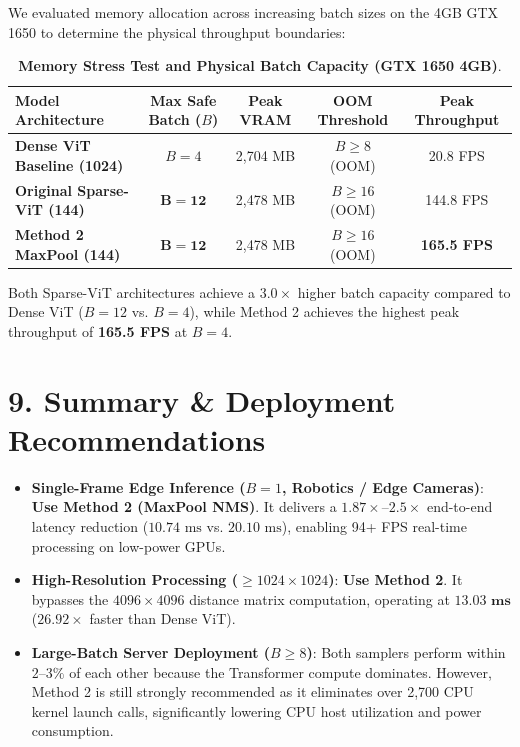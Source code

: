 \documentclass[11pt,a4paper]{article}
\begin{document}
We evaluated memory allocation across increasing batch sizes on the 4GB GTX 1650 to determine the physical throughput boundaries:

\begin{table}[H]
\centering
\small
\renewcommand{\arraystretch}{1.2}
\setlength{\tabcolsep}{10pt}
\begin{tabular}{l ccc c}
\toprule
\textbf{Model Architecture} & \textbf{Max Safe Batch ($B$)} & \textbf{Peak VRAM} & \textbf{OOM Threshold} & \textbf{Peak Throughput} \\
\midrule
\textbf{Dense ViT Baseline (1024)} & $B = 4$ & 2,704 MB & $B \ge 8$ (OOM) & 20.8 FPS \\
\textbf{Original Sparse-ViT (144)} & $\mathbf{B = 12}$ & 2,478 MB & $B \ge 16$ (OOM) & 144.8 FPS \\
\textbf{Method 2 MaxPool (144)}     & $\mathbf{B = 12}$ & 2,478 MB & $B \ge 16$ (OOM) & \textbf{165.5 FPS} \\
\bottomrule
\end{tabular}
\caption{\textbf{Memory Stress Test and Physical Batch Capacity (GTX 1650 4GB)}.}
\label{tab:oom_limits}
\end{table}

Both Sparse-ViT architectures achieve a $\mathbf{3.0\times}$ higher batch capacity compared to Dense ViT ($B=12$ vs. $B=4$), while Method 2 achieves the highest peak throughput of \textbf{165.5 FPS} at $B=4$.

\vspace{0.4em}

\section*{9. Summary \& Deployment Recommendations}

\begin{itemize}[leftmargin=*,itemsep=4pt]
    \item \textbf{Single-Frame Edge Inference ($B=1$, Robotics / Edge Cameras)}: \textbf{Use Method 2 (MaxPool NMS)}. It delivers a $\mathbf{1.87\times\text{--}2.5\times}$ end-to-end latency reduction ($10.74\text{ ms}$ vs. $20.10\text{ ms}$), enabling 94+ FPS real-time processing on low-power GPUs.
    \item \textbf{High-Resolution Processing ($\ge 1024\times 1024$)}: \textbf{Use Method 2}. It bypasses the $4096\times 4096$ distance matrix computation, operating at $\mathbf{13.03\text{ ms}}$ ($\mathbf{26.92\times}$ faster than Dense ViT).
    \item \textbf{Large-Batch Server Deployment ($B \ge 8$)}: Both samplers perform within $2\text{--}3\%$ of each other because the Transformer compute dominates. However, Method 2 is still strongly recommended as it eliminates over 2,700 CPU kernel launch calls, significantly lowering CPU host utilization and power consumption.
\end{itemize}
\end{document}
